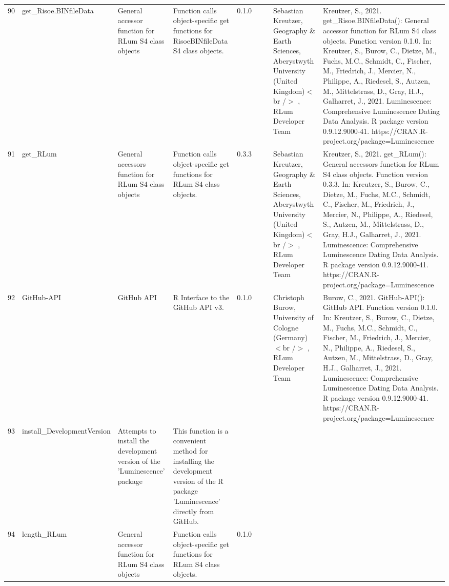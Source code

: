 \begin{table}[ht]
\begin{tabular}{rllllllll}
 \\ 
  90 & get\_Risoe.BINfileData & General accessor function for RLum S4 class objects & Function calls object-specific get functions for RisoeBINfileData S4 class objects. & 0.1.0
 &  &  & Sebastian Kreutzer, Geography \& Earth Sciences, Aberystwyth University (United Kingdom)$<$br /$>$ , RLum Developer Team & Kreutzer, S., 2021. get\_Risoe.BINfileData(): General accessor function for RLum S4 class objects. Function version 0.1.0. In: Kreutzer, S., Burow, C., Dietze, M., Fuchs, M.C., Schmidt, C., Fischer, M., Friedrich, J., Mercier, N., Philippe, A., Riedesel, S., Autzen, M., Mittelstrass, D., Gray, H.J., Galharret, J., 2021. Luminescence: Comprehensive Luminescence Dating Data Analysis. R package version 0.9.12.9000-41. https://CRAN.R-project.org/package=Luminescence
 \\ 
  91 & get\_RLum & General accessors function for RLum S4 class objects & Function calls object-specific get functions for RLum S4 class objects. & 0.3.3
 &  &  & Sebastian Kreutzer, Geography \& Earth Sciences, Aberystwyth University (United Kingdom)$<$br /$>$ , RLum Developer Team & Kreutzer, S., 2021. get\_RLum(): General accessors function for RLum S4 class objects. Function version 0.3.3. In: Kreutzer, S., Burow, C., Dietze, M., Fuchs, M.C., Schmidt, C., Fischer, M., Friedrich, J., Mercier, N., Philippe, A., Riedesel, S., Autzen, M., Mittelstrass, D., Gray, H.J., Galharret, J., 2021. Luminescence: Comprehensive Luminescence Dating Data Analysis. R package version 0.9.12.9000-41. https://CRAN.R-project.org/package=Luminescence
 \\ 
  92 & GitHub-API & GitHub API & R Interface to the GitHub API v3. & 0.1.0
 &  &  & Christoph Burow, University of Cologne (Germany)$<$br /$>$ , RLum Developer Team & Burow, C., 2021. GitHub-API(): GitHub API. Function version 0.1.0. In: Kreutzer, S., Burow, C., Dietze, M., Fuchs, M.C., Schmidt, C., Fischer, M., Friedrich, J., Mercier, N., Philippe, A., Riedesel, S., Autzen, M., Mittelstrass, D., Gray, H.J., Galharret, J., 2021. Luminescence: Comprehensive Luminescence Dating Data Analysis. R package version 0.9.12.9000-41. https://CRAN.R-project.org/package=Luminescence
 \\ 
  93 & install\_DevelopmentVersion & Attempts to install the development version of the 'Luminescence' package & This function is a convenient method for installing the development version of the R package 'Luminescence' directly from GitHub. &  &  &  &  &  \\ 
  94 & length\_RLum & General accessor function for RLum S4 class objects & Function calls object-specific get functions for RLum S4 class objects. & 0.1.0

\end{tabular}
\end{table}
